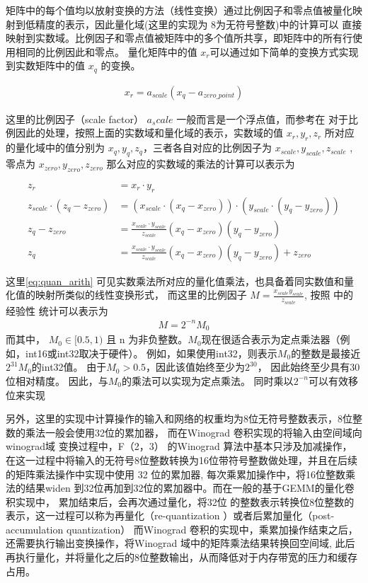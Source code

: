 矩阵中的每个值均以放射变换的方法（线性变换）通过比例因子和零点值被量化映射到低精度的表示，因此量化域(这里的实现为
8为无符号整数)中的计算可以
直接映射到实数域。比例因子和零点值被矩阵中的多个值所共享，即矩阵中的所有行使用相同的比例因此和零点。
量化矩阵中的值 $x_r$可以通过如下简单的变换方式实现到实数矩阵中的值 $x_q$ 的变换。

\begin{align}
  x_r = a_{scale} (x_q - a_{zero\_point})
\end{align}

这里的比例因子（scale factor） $a_scale$ 一般而言是一个浮点值，而参考在 \cite{Jacob2017QuantizationAT}
对于比例因此的处理，按照上面的实数域和量化域的表示，实数域的值 $x_r, y_r, z_r$ 所对应的量化域中的值分别为
$x_q, y_q, z_q$，三者各自对应的比例因子为 $x_{scale}, y_{scale}, z_{scale}$ , 零点为 $x_{zero}, y_{zero},
 z_{zero}$
那么对应的实数域的乘法的计算可以表示为

\begin{align}
\label{eq:quan_arith}
z_r &= x_r \cdot y_r\\
z_{scale} \cdot (z_q - z_{zero}) &= (x_{scale} \cdot (x_q - x_{zero})) \cdot (y_{scale} \cdot (y_q - y_{zero})) \\
z_q - z_{zero} &= \frac{x_{scale}\cdot y_{scale}}{z_{scale}} (x_q - x_{zero}) (y_q - y_{zero})\\
z_q &= \frac{x_{scale}\cdot y_{scale}}{z_{scale}} (x_q - x_{zero}) (y_q - y_{zero}) + z_{zero}
\end{align}

这里\ref{eq:quan_arith} 可见实数乘法所对应的量化值乘法，也具备着同实数值和量化值的映射所类似的线性变换形式，
而这里的比例因子 $ M = \frac{x_{scale} y_{scale}}{z_{scale}}$, 按照 \cite{Jacob2017QuantizationAT} 中的经验性
统计可以表示为
\begin{align}
M = 2^{-n} M_0
\end{align}
而其中， $M_0 \in [0.5, 1)$ 且 n 为非负整数。$ M_0$现在很适合表示为定点乘法器（例如，int16或int32取决于硬件）。
例如，如果使用int32，则表示$M_0$的整数是最接近$2^{31}M_0$的int32值。 由于$M_0> 0.5$，因此该值始终至少为$2^{30}$，
因此始终至少具有30位相对精度。 因此，与$M_0$的乘法可以实现为定点乘法。 同时乘以$2^{-n}$可以有效移位来实现

另外，这里的实现中计算操作的输入和网络的权重均为8位无符号整数表示，8位整数的乘法一般会使用32位的累加器，
而在Winograd 卷积实现的将输入由空间域向winograd域 变换过程中，F（2，3） 的Winograd 算法中基本只涉及加减操作，
在这一过程中将输入的无符号8位整数转换为16位带符号整数做处理，并且在后续的矩阵乘法操作中实现中使用 32 位的累加器,
每次乘累加操作中，将16位整数乘法的结果widen 到32位再加到32位的累加器中。而在一般的基于GEMM的量化卷积实现中，
累加结束后，会再次通过量化，将32位 的整数表示转换位8位整数的表示，这一过程可以称为再量化（re-quantization ）或者后累加量化（post-accumulation quantization）
而Winograd 卷积的实现中，乘累加操作结束之后，还需要执行输出变换操作，将Winograd 域中的矩阵乘法结果转换回空间域,
此后再执行量化，并将量化之后的8位整数输出，从而降低对于内存带宽的压力和缓存占用。

